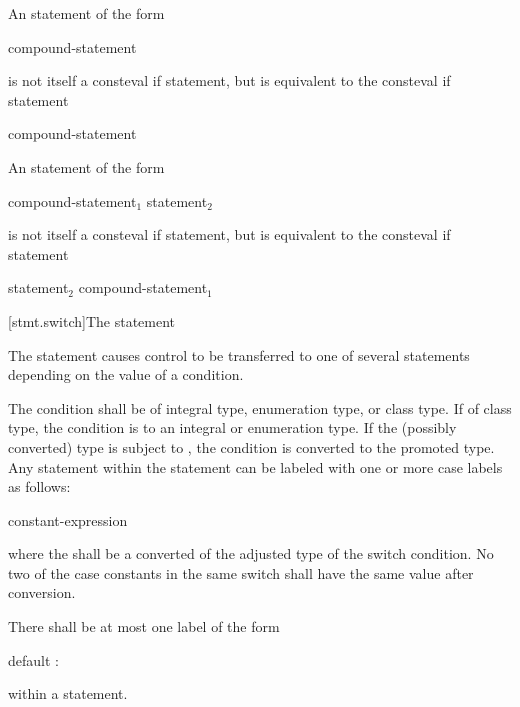 \pnum
An  statement of the form
\begin{ncsimplebnf}
 \terminal{!}  compound-statement
\end{ncsimplebnf}
is not itself a consteval if statement,
but is equivalent to the consteval if statement
\begin{ncsimplebnf}
  \terminal{\{} \terminal{\}}  compound-statement
\end{ncsimplebnf}
An  statement of the form
\begin{ncsimplebnf}
 \terminal{!}  compound-statement$_1$  statement$_2$
\end{ncsimplebnf}
is not itself a consteval if statement,
but is equivalent to the consteval if statement
\begin{ncsimplebnf}
  statement$_2$  compound-statement$_1$
\end{ncsimplebnf}

[stmt.switch]{The  statement}%

\pnum
The  statement causes control to be transferred to one of
several statements depending on the value of a condition.

\pnum
The condition shall be of integral type, enumeration type, or class
type. If of class type, the
condition is  to
an integral or enumeration type.
If the (possibly converted) type is subject to , the condition is converted
to the promoted type.
Any
statement within the  statement can be labeled with one or
more case labels as follows:
\begin{ncbnf}
%
 constant-expression \terminal{:}
\end{ncbnf}
where the  shall be
a converted  of the
adjusted type of the switch condition. No two of the case constants in
the same switch shall have the same value after conversion.

\pnum
{}%
There shall be at most one label of the form
\begin{codeblock}
default :
\end{codeblock}
within a  statement.

